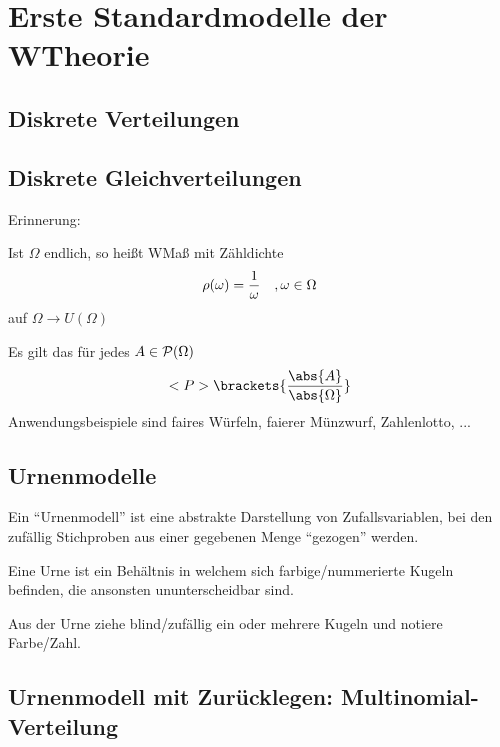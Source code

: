 \section{Erste Standardmodelle der WTheorie} %

\subsection{Diskrete Verteilungen}

\subsection{Diskrete Gleichverteilungen}


Erinnerung:
\begin{definition} %
	Ist $\Omega$ endlich, so heißt WMaß mit Zähldichte
	\begin{align}
		\rho(\omega) = \frac{1}{\omega}\quad, \omega \in \Omega\notag
	\end{align}
	 auf $\Omega \to U(\Omega)$\notag
\end{definition}
Es gilt das für jedes $A \in \mathcal{P}(\Omega)$
\begin{align}
	\probp\brackets{\frac{\abs{A}}{\abs{\Omega}}}\notag
\end{align}
Anwendungsbeispiele sind faires Würfeln, faierer Münzwurf, Zahlenlotto, ...

\subsection{Urnenmodelle}

Ein ``Urnenmodell'' ist eine abstrakte Darstellung von Zufallsvariablen, bei den zufällig Stichproben aus einer gegebenen Menge ``gezogen'' werden.
\begin{*definition}[Urne]
	Eine Urne ist ein Behältnis in welchem sich farbige/nummerierte Kugeln befinden, die ansonsten ununterscheidbar sind.
\end{*definition}
Aus der Urne ziehe blind/zufällig ein oder mehrere Kugeln und notiere Farbe/Zahl.


\subsection{Urnenmodell mit Zurücklegen: Multinomial-Verteilung}

